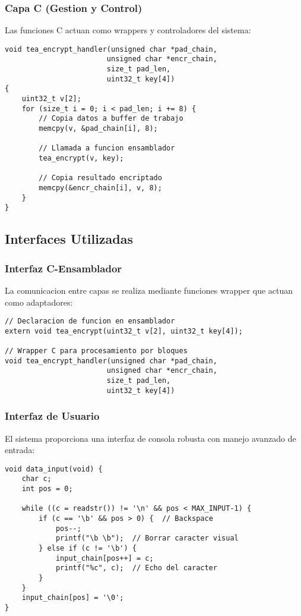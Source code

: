 \documentclass[12pt,a4paper]{article}
\begin{document}
\subsubsection{Capa C (Gestion y Control)}
Las funciones C actuan como wrappers y controladores del sistema:

\begin{lstlisting}[caption=Wrapper de Encriptacion]
void tea_encrypt_handler(unsigned char *pad_chain, 
                        unsigned char *encr_chain, 
                        size_t pad_len, 
                        uint32_t key[4])
{
    uint32_t v[2];
    for (size_t i = 0; i < pad_len; i += 8) {
        // Copia datos a buffer de trabajo
        memcpy(v, &pad_chain[i], 8);
        
        // Llamada a funcion ensamblador
        tea_encrypt(v, key);
        
        // Copia resultado encriptado
        memcpy(&encr_chain[i], v, 8);
    }
}
\end{lstlisting}

\subsection{Interfaces Utilizadas}

\subsubsection{Interfaz C-Ensamblador}
La comunicacion entre capas se realiza mediante funciones wrapper que actuan como adaptadores:

\begin{lstlisting}[caption=Interfaz de Encriptacion]
// Declaracion de funcion en ensamblador
extern void tea_encrypt(uint32_t v[2], uint32_t key[4]);

// Wrapper C para procesamiento por bloques
void tea_encrypt_handler(unsigned char *pad_chain, 
                        unsigned char *encr_chain, 
                        size_t pad_len, 
                        uint32_t key[4])
\end{lstlisting}

\subsubsection{Interfaz de Usuario}
El sistema proporciona una interfaz de consola robusta con manejo avanzado de entrada:

\begin{lstlisting}[caption=Sistema de Entrada de Datos]
void data_input(void) {
    char c;
    int pos = 0;
    
    while ((c = readstr()) != '\n' && pos < MAX_INPUT-1) {
        if (c == '\b' && pos > 0) {  // Backspace
            pos--;
            printf("\b \b");  // Borrar caracter visual
        } else if (c != '\b') {
            input_chain[pos++] = c;
            printf("%c", c);  // Echo del caracter
        }
    }
    input_chain[pos] = '\0';
}
\end{lstlisting}
\end{document}

